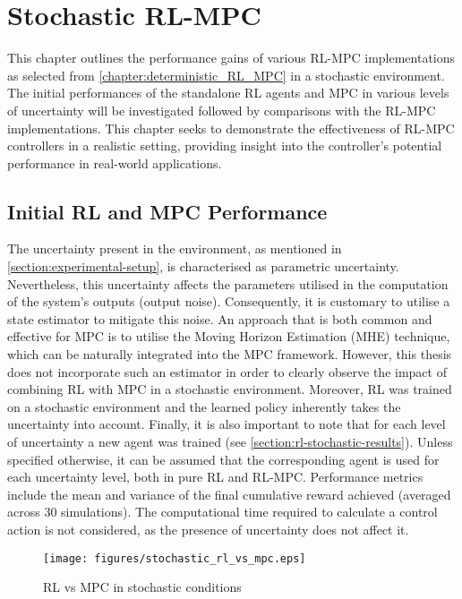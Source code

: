 \chapter{Stochastic RL-MPC}
\label{chapter:stochastic_RL_MPC}

This chapter outlines the performance gains of various RL-MPC implementations as selected from \autoref{chapter:deterministic_RL_MPC} in a stochastic environment. The initial performances of the standalone RL agents and MPC in various levels of uncertainty will be investigated followed by comparisons with the RL-MPC implementations. This chapter seeks to demonstrate the effectiveness of RL-MPC controllers in a realistic setting, providing insight into the controller's potential performance in real-world applications.

\section{Initial RL and MPC Performance}
The uncertainty present in the environment, as mentioned in \autoref{section:experimental-setup}, is characterised as parametric uncertainty. Nevertheless, this uncertainty affects the parameters utilised in the computation of the system's outputs (output noise). Consequently, it is customary to utilise a state estimator to mitigate this noise. An approach that is both common and effective for MPC is to utilise the Moving Horizon Estimation (MHE) technique, which can be naturally integrated into the MPC framework. However, this thesis does not incorporate such an estimator in order to clearly observe the impact of combining RL with MPC in a stochastic environment. Moreover, RL was trained on a stochastic environment and the learned policy inherently takes the uncertainty into account. Finally, it is also important to note that for each level of uncertainty a new agent was trained (see \autoref{section:rl-stochastic-results}). Unless specified otherwise, it can be assumed that the corresponding agent is used for each uncertainty level, both in pure RL and RL-MPC. Performance metrics include the mean and variance of the final cumulative reward achieved (averaged across 30 simulations). The computational time required to calculate a control action is not considered, as the presence of uncertainty does not affect it. 


\begin{figure}[H]
	\centering
	\texttt{[image: figures/stochastic\_rl\_vs\_mpc.eps]}
	\caption{RL vs MPC in stochastic conditions}
	\label{fig:stochastic-rl-vs-mpc}
\end{figure}

